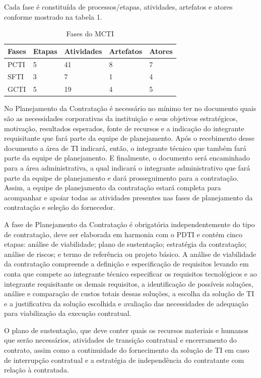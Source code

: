 Cada fase é constituída de processos/etapas, atividades, artefatos e atores conforme mostrado na tabela 1.
  
\begin{table}[htb]
\center
\footnotesize
\begin{tabular}{|p{1.4cm}|p{1cm}|p{3cm}|p{3cm}|p{3cm}|}
  \hline
   \textbf{Fases} & \textbf{Etapas}  & \textbf{Atividades}  & \textbf{Artefatos} & \textbf{Atores}  \\
    \hline
    PCTI & 5 & 41 & 8 & 7\\
   \hline    
    SFTI & 3 & 7 & 1 & 4\\
    \hline
    GCTI & 5 & 19 & 4 & 5\\
   \hline
\end{tabular}
\caption{Fases do MCTI}
\end{table}


No Planejamento da Contratação é necessário no mínimo ter no documento quais são as necessidades corporativas da instituição e seus objetivos estratégicos, motivação, resultados esperados, fonte de recursos e a indicação do integrante requisitante que fará parte da equipe de planejamento.  Após o recebimento desse documento a área de TI indicará, então, o integrante técnico que também fará parte da equipe de planejamento. E finalmente, o documento será encaminhado para a área administrativa, a qual indicará o integrante administrativo que fará parte da equipe de planejamento e dará prosseguimento para a contratação. Assim, a equipe de planejamento da contratação estará completa para acompanhar e apoiar todas as atividades presentes nas fases de planejamento da contratação e seleção do fornecedor.

A fase de Planejamento da Contratação é obrigatória independentemente do tipo de contratação, deve ser elaborada em harmonia com o PDTI e contém cinco etapas: análise de viabilidade; plano de sustentação; estratégia da contratação; análise de riscos; e termo de referência ou projeto básico. A análise de viabilidade da contratação compreende a definição e especificação de requisitos levando em conta que compete ao integrante técnico especificar os requisitos tecnológicos e ao integrante requisitante os demais requisitos, a identificação de possíveis soluções, análise e comparação de custos totais dessas soluções, a escolha da solução de TI e a justificativa da solução escolhida e avaliação das necessidades de adequação para viabilização da execução contratual. 

O plano de sustentação, que deve conter quais os recursos materiais e humanos que serão necessários, atividades de transição contratual e encerramento do contrato, assim como a continuidade do fornecimento da solução de TI em caso de interrupção contratual e a estratégia de independência do contratante com relação à contratada. 

